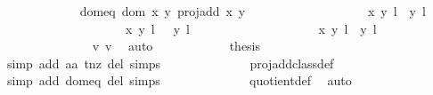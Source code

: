 \begin{isabellebody}
\ \ \ \ \ \ \ \ \ \ \isamarkupfalse%
\ dom{\isacharunderscore}eq{\isacharcolon}\ {\isachardoublequoteopen}{\isacharparenleft}dom\ {\isacharparenleft}{\isasymlambda}{\isacharparenleft}x{\isacharcomma}\ y{\isacharparenright}{\isachardot}\ proj{\isacharunderscore}add\ x\ y{\isacharparenright}\ {\isasyminter}\isanewline
\ \ \ \ \ \ \ \ \ \ \ \ \ \ \ \ \ \ {\isacharbraceleft}{\isacharparenleft}{\isacharparenleft}{\isacharparenleft}x{\isacharcomma}\ y{\isacharparenright}{\isacharcomma}\ l{\isacharparenright}{\isacharcomma}\ {\isacharparenleft}{}{\isacharcomma}\ y{\isacharprime}{\isacharparenright}{\isacharcomma}\ l{\isacharprime}{\isacharparenright}{\isacharcomma}\isanewline
\ \ \ \ \ \ \ \ \ \ \ \ \ \ \ \ \ \ \ {\isacharparenleft}{\isacharparenleft}{\isacharparenleft}x{\isacharcomma}\ y{\isacharparenright}{\isacharcomma}\ l{\isacharparenright}{\isacharcomma}\ {\isasymtau}\ {\isacharparenleft}{}{\isacharcomma}\ y{\isacharprime}{\isacharparenright}{\isacharcomma}\ l{\isacharprime}\ {\isacharplus}\ {}{\isacharparenright}{\isacharbraceright}{\isacharparenright}\ {\isacharequal}\ \isanewline
\ \ \ \ \ \ \ \ \ \ \ \ \ \ \ \ {\isacharbraceleft}{\isacharparenleft}{\isacharparenleft}{\isacharparenleft}x{\isacharcomma}\ y{\isacharparenright}{\isacharcomma}\ l{\isacharparenright}{\isacharcomma}\ {\isacharparenleft}{}{\isacharcomma}\ y{\isacharprime}{\isacharparenright}{\isacharcomma}\ l{\isacharprime}{\isacharparenright}{\isacharbraceright}{\isachardoublequoteclose}\ \isanewline
\ \ \ \ \ \ \ \ \ \ \ \ \isamarkupfalse%
\ v{}\ v{}\ \isamarkupfalse%
\ auto\isanewline
\ \ \ \ \ \ \ \ \ \ \isamarkupfalse%
\ {\isacharquery}thesis\ \isanewline
\ \ \ \ \ \ \ \ \ \ \ \ \isamarkupfalse%
\ {}\ \isamarkupfalse%
{\isacharparenleft}simp\ add{\isacharcolon}\ aa\ t{\isacharunderscore}nz\ del{\isacharcolon}\ {\isasymtau}{\isachardot}simps{\isacharparenright}\isanewline
\ \ \ \ \ \ \ \ \ \ \ \ \isamarkupfalse%
\ proj{\isacharunderscore}add{\isacharunderscore}class{\isacharunderscore}def\ \isamarkupfalse%
{\isacharparenleft}simp\ add{\isacharcolon}\ dom{\isacharunderscore}eq\ del{\isacharcolon}\ {\isasymtau}{\isachardot}simps{\isacharparenright}\isanewline
\ \ \ \ \ \ \ \ \ \ \ \ \isamarkupfalse%
\ quotient{\isacharunderscore}def\ \isamarkupfalse%
\ auto\isanewline
\ \ \ \ \ \ \ \ \isamarkupfalse%
\isanewline

\end{isabellebody}
